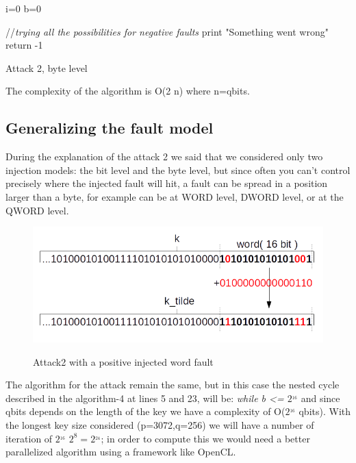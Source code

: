 \documentclass[11pt,english]{article}
\begin{document}
\begin{itemize}
\begin{algorithm}[H]
  i=0\;  
  b=0\;
  
  //\textit{trying all the possibilities for negative faults}\;
  print "Something went wrong"\;
  return -1

  \caption{Attack 2, byte level}
\end{algorithm}
\end{itemize}

The complexity of the algorithm is O(2  \cdot n) where n=qbits.

\subsection{Generalizing the fault model}
During the explanation of the attack 2 we said that we considered only two injection models: the bit level and the byte level, but since often you can't control precisely where the injected fault will hit, a fault can be spread in a position larger than a byte, for example can be at WORD level, DWORD level, or at the QWORD level. 

\begin{figure}[H]
\includegraphics[width=1.0\textwidth]{img/attack2word.png} \\
\caption{\label{f_etichetta}Attack2 with a positive injected word fault }
\end{figure}

The algorithm for the attack remain the same, but in this case the nested cycle described in the algorithm-4 at lines 5 and 23, will be: \textit{while b <= $2^_{16}$} and since qbits depends on the length of the key we have a complexity of O($2^_{16}$ \cdot qbits). With the longest key size considered (p=3072,q=256) we will have a number of iteration of $2^_{16}$ \cdot $2^{8} = 2^_{24}$; in order to compute this we would need a better parallelized algorithm using a framework like OpenCL\cite{opencl}.
\end{document}
